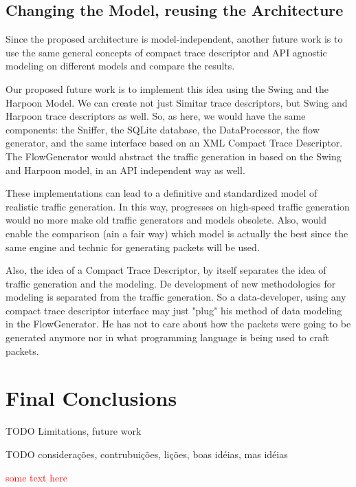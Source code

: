 \subsection{Changing the Model, reusing the Architecture}

Since the proposed architecture is model-independent, another future work is to use the same general concepts of compact trace descriptor and API agnostic modeling on different models and compare the results.

Our proposed future work is to implement this idea using the Swing\cite{swing-paper} and the Harpoon Model\cite{harpoon-paper}.  We can create not just Simitar trace descriptors, but Swing and Harpoon trace descriptors as well. So, as here, we would have the same components: the Sniffer, the SQLite database, the DataProcessor, the flow generator, and the same interface based on an XML Compact Trace Descriptor. The FlowGenerator would abstract the traffic generation in based on the Swing and Harpoon model, in an API independent way as well. 

These implementations can lead to a definitive and standardized model of realistic traffic generation. In this way, progresses on high-speed traffic generation would no more make old traffic generators and models obsolete. Also, would enable the comparison (ain a fair way) which model is actually the best since the same engine and technic for generating packets will be used.

Also, the idea of a Compact Trace Descriptor, by itself separates the idea of traffic generation and the modeling. De development of new methodologies for modeling is  separated from the traffic generation. So a data-developer, using any compact trace descriptor interface may just "plug" his method of data modeling in the FlowGenerator. He has not to care about how the packets were going to be generated anymore nor in what programming language is being used to craft packets.


\section{Final Conclusions}

TODO Limitations, future work

TODO considerações, contrubuições, lições, boas idéias, mas idéias



\textcolor{red}{some text here}







